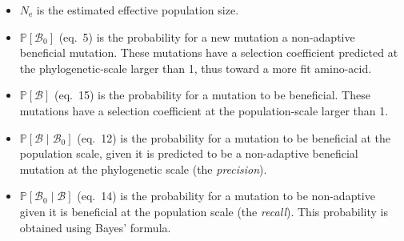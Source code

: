 \documentclass{article}
\newcommand{\Ne}{N_{\text{e}}}
\newcommand{\proba}{\mathbb{P}}
\newcommand{\SphyBen}{\mathcal{B}_0}
\newcommand{\given}{\mid}
\newcommand{\SpopBen}{\mathcal{B}}
\begin{document}
    \begin{itemize}
        \item $\Ne$ is the estimated effective population size.
        \item $\proba [ \SphyBen ]$ (eq.~5) is the probability for a new mutation a non-adaptive beneficial mutation.
        These mutations have a selection coefficient predicted at the phylogenetic-scale larger than 1, thus toward a more fit amino-acid.
        \item $\proba [ \SpopBen ]$ (eq.~15) is the probability for a mutation to be beneficial.
        These mutations have a selection coefficient at the population-scale larger than 1.
        \item $\proba [ \SpopBen \given \SphyBen]$ (eq.~12) is the probability for a mutation to be beneficial at the population scale, given it is predicted to be a non-adaptive beneficial mutation at the phylogenetic scale (the \textit{precision}).
        \item $\proba [ \SphyBen \given \SpopBen]$ (eq.~14) is the probability for a mutation to be non-adaptive given it is beneficial at the population scale (the \textit{recall}).
        This probability is obtained using Bayes' formula.
    \end{itemize}
    \newpage
\end{document}
